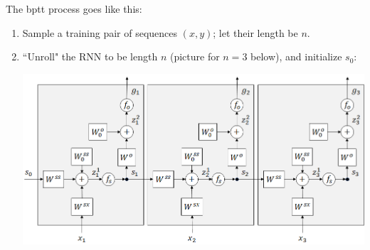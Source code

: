 \noindent The {\sc bptt} process goes like this:
\begin{enumerate}[(1)]
  \item
        Sample a training pair of  sequences $(x, y)$; let their length be $n$.
  \item
        ``Unroll" the RNN to be length $n$ (picture for $n = 3$ below), and
        initialize $s_0$:

        \centerline{\includegraphics[width=\textwidth]{figures/rnn_unrolled_with_offsets.png}}


\end{enumerate}
